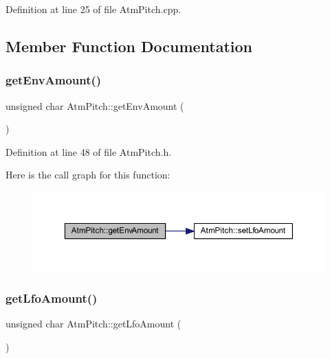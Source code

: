 Definition at line 25 of file Atm\+Pitch.\+cpp.



\subsection{Member Function Documentation}
\mbox{\label{class_atm_pitch_a850e1e507b70bc3a12049d48cd65283f}} 
\subsubsection{\texorpdfstring{get\+Env\+Amount()}{getEnvAmount()}}
{\footnotesize\ttfamily unsigned char Atm\+Pitch\+::get\+Env\+Amount (\begin{DoxyParamCaption}{ }\end{DoxyParamCaption})\hspace{0.3cm}{\ttfamily [inline]}}



Definition at line 48 of file Atm\+Pitch.\+h.

Here is the call graph for this function\+:
\nopagebreak
\begin{figure}[H]
\begin{center}
\leavevmode
\includegraphics[width=350pt]{dd/d34/class_atm_pitch_a850e1e507b70bc3a12049d48cd65283f_cgraph}
\end{center}
\end{figure}
\mbox{\label{class_atm_pitch_ace9d80c3de42d8e0920e6d23cf753dcc}} 
\subsubsection{\texorpdfstring{get\+Lfo\+Amount()}{getLfoAmount()}}
{\footnotesize\ttfamily unsigned char Atm\+Pitch\+::get\+Lfo\+Amount (\begin{DoxyParamCaption}{ }\end{DoxyParamCaption})\hspace{0.3cm}{\ttfamily [inline]}}



